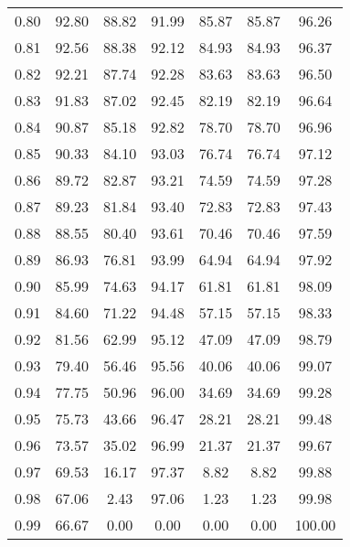 \begin{tabular}{|c|c|c|c|c|c|c|}
      0.80 &     92.80 &     88.82 &      91.99 &   85.87 &      85.87 &         96.26 \\
      0.81 &     92.56 &     88.38 &      92.12 &   84.93 &      84.93 &         96.37 \\
      0.82 &     92.21 &     87.74 &      92.28 &   83.63 &      83.63 &         96.50 \\
      0.83 &     91.83 &     87.02 &      92.45 &   82.19 &      82.19 &         96.64 \\
      0.84 &     90.87 &     85.18 &      92.82 &   78.70 &      78.70 &         96.96 \\
      0.85 &     90.33 &     84.10 &      93.03 &   76.74 &      76.74 &         97.12 \\
      0.86 &     89.72 &     82.87 &      93.21 &   74.59 &      74.59 &         97.28 \\
      0.87 &     89.23 &     81.84 &      93.40 &   72.83 &      72.83 &         97.43 \\
      0.88 &     88.55 &     80.40 &      93.61 &   70.46 &      70.46 &         97.59 \\
      0.89 &     86.93 &     76.81 &      93.99 &   64.94 &      64.94 &         97.92 \\
      0.90 &     85.99 &     74.63 &      94.17 &   61.81 &      61.81 &         98.09 \\
      0.91 &     84.60 &     71.22 &      94.48 &   57.15 &      57.15 &         98.33 \\
      0.92 &     81.56 &     62.99 &      95.12 &   47.09 &      47.09 &         98.79 \\
      0.93 &     79.40 &     56.46 &      95.56 &   40.06 &      40.06 &         99.07 \\
      0.94 &     77.75 &     50.96 &      96.00 &   34.69 &      34.69 &         99.28 \\
      0.95 &     75.73 &     43.66 &      96.47 &   28.21 &      28.21 &         99.48 \\
      0.96 &     73.57 &     35.02 &      96.99 &   21.37 &      21.37 &         99.67 \\
      0.97 &     69.53 &     16.17 &      97.37 &    8.82 &       8.82 &         99.88 \\
      0.98 &     67.06 &      2.43 &      97.06 &    1.23 &       1.23 &         99.98 \\
      0.99 &     66.67 &      0.00 &       0.00 &    0.00 &       0.00 &        100.00 \\
\bottomrule
\end{tabular}
